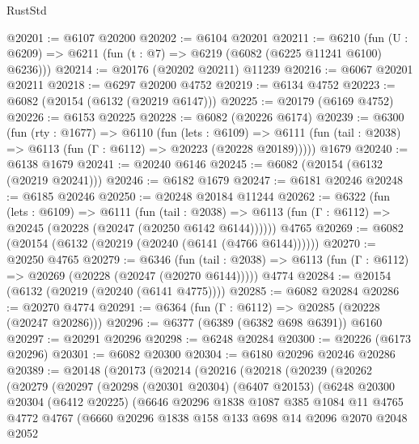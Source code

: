 \begin{lexlean}{RustStd}
\begin{coremodule}
@20201 := @6107 @20200
@20202 := @6104 @20201
@20211 := @6210
    (fun (U : @6209) => @6211 (fun (t : @7) => @6219 (@6082 (@6225 @11241 @6100) @6236)))
@20214 := @20176 (@20202 @20211) @11239
@20216 := @6067 @20201 @20211
@20218 := @6297 @20200 @4752
@20219 := @6134 @4752
@20223 := @6082 (@20154 (@6132 (@20219 @6147)))
@20225 := @20179 (@6169 @4752)
@20226 := @6153 @20225
@20228 := @6082 (@20226 @6174)
@20239 := @6300
    (fun (rty : @1677) =>
    @6110
      (fun (lets : @6109) =>
      @6111 (fun (tail : @2038) => @6113 (fun (Γ : @6112) => @20223 (@20228 @20189)))))
    @1679
@20240 := @6138 @1679
@20241 := @20240 @6146
@20245 := @6082 (@20154 (@6132 (@20219 @20241)))
@20246 := @6182 @1679
@20247 := @6181 @20246
@20248 := @6185 @20246
@20250 := @20248 @20184 @11244
@20262 := @6322
    (fun (lets : @6109) =>
    @6111
      (fun (tail : @2038) =>
      @6113 (fun (Γ : @6112) => @20245 (@20228 (@20247 (@20250 @6142 @6144))))))
    @4765
@20269 := @6082 (@20154 (@6132 (@20219 (@20240 (@6141 (@4766 @6144))))))
@20270 := @20250 @4765
@20279 := @6346
    (fun (tail : @2038) => @6113 (fun (Γ : @6112) => @20269 (@20228 (@20247 (@20270 @6144)))))
    @4774
@20284 := @20154 (@6132 (@20219 (@20240 (@6141 @4775))))
@20285 := @6082 @20284
@20286 := @20270 @4774
@20291 := @6364 (fun (Γ : @6112) => @20285 (@20228 (@20247 @20286)))
@20296 := @6377 (@6389 (@6382 @698 @6391)) @6160
@20297 := @20291 @20296
@20298 := @6248 @20284
@20300 := @20226 (@6173 @20296)
@20301 := @6082 @20300
@20304 := @6180 @20296 @20246 @20286
@20389 := @20148
    (@20173
      (@20214
        (@20216
          (@20218
            (@20239
              (@20262
                (@20279
                  (@20297
                    (@20298
                      (@20301 @20304)
                      (@6407 @20153)
                      (@6248
                        @20300
                        @20304
                        (@6412 @20225)
                        (@6646
                          @20296
                          @1838
                          @1087
                          @385
                          @1084
                          @11
                          @4765
                          @4772
                          @4767
                          (@6660
                            @20296
                            @1838
                            @158
                            @133
                            @698
                            @14
                            @2096
                            @2070
                            @2048
                            @2052

\end{coremodule}
\end{lexlean}
